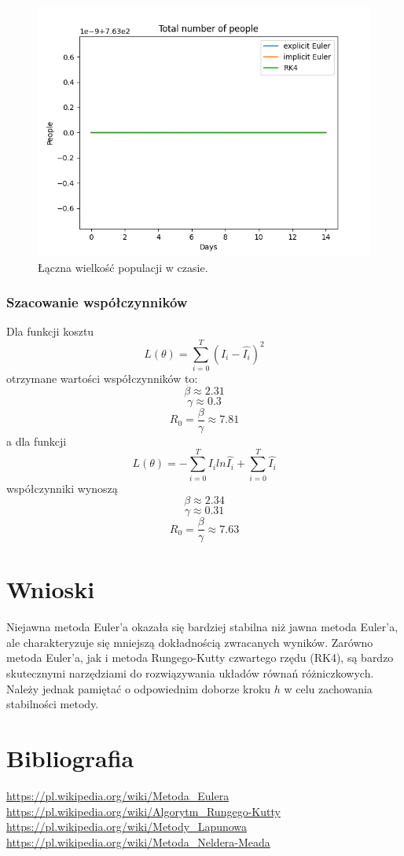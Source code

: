 \documentclass[11pt, leqno]{scrartcl}
\begin{document}
    \begin{figure}[H]
        \centering
        \includegraphics[width=0.7\linewidth]{total_people.png}
        \caption{Łączna wielkość populacji w czasie.}
    \end{figure}

    \subsubsection{Szacowanie współczynników}
    Dla funkcji kosztu
    \[
        L(\theta)=\sum_{i=0}^{T}(I_i-\hat{I_i})^2
    \]
    otrzymane wartości współczynników to:
    \[
        \beta \approx 2.31
    \]
    \[
        \gamma \approx 0.3
    \]
    \[
        R_0=\frac{\beta}{\gamma} \approx 7.81
    \]
    a dla funkcji
    \[
        L(\theta)=-\sum_{i=0}^{T}I_iln\hat{I_i}+
            \sum_{i=0}^{T}\hat{I_i}
    \]
    współczynniki wynoszą
    \[
        \beta \approx 2.34
    \]
    \[
        \gamma \approx 0.31
    \]
    \[
        R_0=\frac{\beta}{\gamma} \approx 7.63
    \]

    \section{Wnioski}
    Niejawna metoda Euler'a okazała się bardziej stabilna niż
    jawna metoda Euler'a, ale charakteryzuje się mniejszą
    dokładnością zwracanych wyników. Zarówno metoda Euler'a,
    jak i metoda Rungego-Kutty czwartego rzędu (RK4), są bardzo
    skutecznymi narzędziami do rozwiązywania układów równań
    różniczkowych. Należy jednak pamiętać o odpowiednim doborze
    kroku $h$ w celu zachowania stabilności metody.

    \section{Bibliografia}
    \url{https://pl.wikipedia.org/wiki/Metoda_Eulera} \\
    \url{https://pl.wikipedia.org/wiki/Algorytm_Rungego-Kutty} \\
    \url{https://pl.wikipedia.org/wiki/Metody_Lapunowa} \\
    \url{https://pl.wikipedia.org/wiki/Metoda_Neldera-Meada}
    
\end{document}
